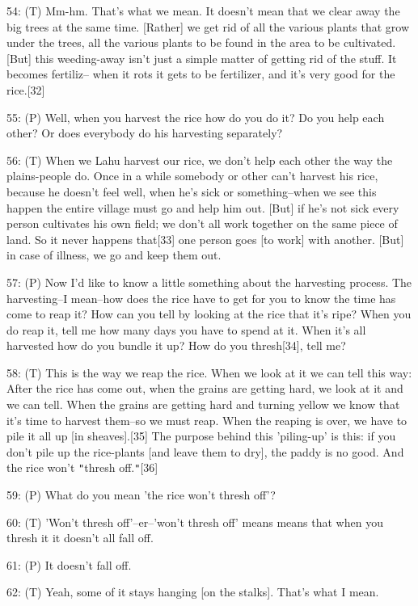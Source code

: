 54: (T) Mm-hm. That's what we mean. It doesn't mean that we clear away the big
trees at the same time. [Rather] we get rid of all the various plants that grow
under the trees, all the various plants to be found in the area to be cultivated.
[But] this weeding-away isn't just a simple matter of getting rid of the stuff.
It becomes fertiliz-- when it rots it gets to be fertilizer, and it's very good
for the rice.[32]

55: (P) Well, when you harvest the rice how do you do it? Do you help each other?
Or does everybody do his harvesting separately?

56: (T) When we Lahu harvest our rice, we don't help each other the way the plains-people
do. Once in a while somebody or other can't harvest his rice, because he doesn't
feel well, when he's sick or something--when we see this happen the entire village
must go and help him out. [But] if he's not sick every person cultivates his own
field; we don't all work together on the same piece of land. So it never happens
that[33] one person goes [to work] with another. [But] in case of illness, we go
and keep them out.

57: (P) Now I'd like to know a little something about the harvesting process. The
harvesting--I mean--how does the rice have to get for you to know the time has
come to reap it? How can you tell by looking at the rice that it's ripe? When you
do reap it, tell me how many days you have to spend at it. When it's all harvested
how do you bundle it up? How do you thresh[34], tell me?

58: (T) This is the way we reap the rice. When we look at it we can tell this way:
After the rice has come out, when the grains are getting hard, we look at it and
we can tell. When the grains are getting hard and turning yellow we know that it's
time to harvest them--so we must reap. When the reaping is over, we have to pile
it all up [in sheaves].[35] The purpose behind this 'piling-up' is this: if you
don't pile up the rice-plants [and leave them to dry], the paddy is no good. And
the rice won't \texttt{"}thresh off.\texttt{"}[36]

59: (P) What do you mean 'the rice won't thresh off'?

60: (T) 'Won't thresh off'--er--'won't thresh off' means means that when you thresh
it it doesn't all fall off.

61: (P) It doesn't fall off.

62: (T) Yeah, some of it stays hanging [on the stalks]. That's what I mean.

